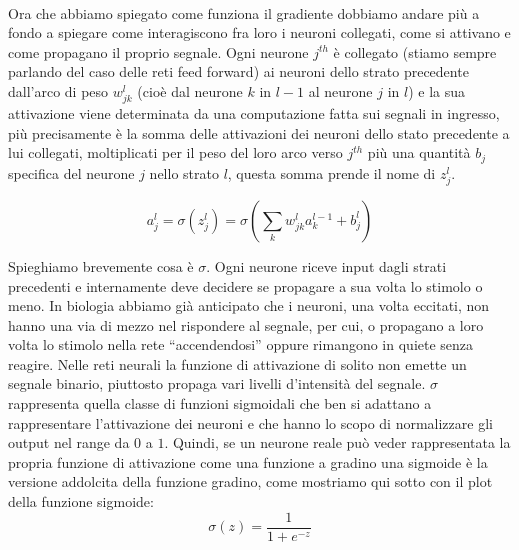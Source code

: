 \\
Ora che abbiamo spiegato come funziona il gradiente dobbiamo andare più a fondo a spiegare come interagiscono fra loro i neuroni collegati, come si attivano e come propagano il proprio segnale.
Ogni neurone $j^{th}$ è collegato (stiamo sempre parlando del caso delle reti feed forward) ai neuroni dello strato precedente dall'arco di peso $w^{l}_{jk}$ (cioè dal neurone $k$ in $l-1$ al neurone $j$ in $l$) e la sua attivazione viene determinata da una computazione fatta sui segnali in ingresso, più precisamente è la somma delle attivazioni dei neuroni dello stato precedente a lui collegati, moltiplicati per il peso del loro arco verso $j^{th}$ più una quantità $b_{j}$ specifica del neurone $j$ nello strato $l$, questa somma prende il nome di $z^{l}_{j}$. 

\begin{equation}
\displaystyle a^{l}_{j}=\sigma\left( z^{l}_{j}\right) = \sigma \left( \sum_{k}w^{l}_{jk}a^{l-1}_k +b^{l}_{j} \right)
\end{equation}

Spieghiamo brevemente cosa è $\sigma$. Ogni neurone riceve input dagli strati precedenti e internamente deve decidere se propagare a sua volta lo stimolo o meno. In biologia abbiamo già anticipato che i neuroni, una volta eccitati, non hanno una via di mezzo nel rispondere al segnale, per cui, o propagano a loro volta lo stimolo nella rete ``accendendosi''  oppure rimangono in quiete senza reagire. Nelle reti neurali la funzione di attivazione di solito non emette un segnale binario, piuttosto propaga vari livelli d'intensità del segnale. $\sigma$ rappresenta quella classe di funzioni sigmoidali che ben si adattano a rappresentare l'attivazione dei neuroni e che hanno lo scopo di normalizzare gli output nel range da $0$ a $1$. Quindi, se un neurone reale può veder rappresentata la propria funzione di attivazione come una funzione a gradino una sigmoide è la versione addolcita della funzione gradino, come mostriamo qui sotto con il plot della funzione sigmoide:
\begin{equation}
	\sigma(z)=\dfrac{1}{1+e^{-z}}
\end{equation}

